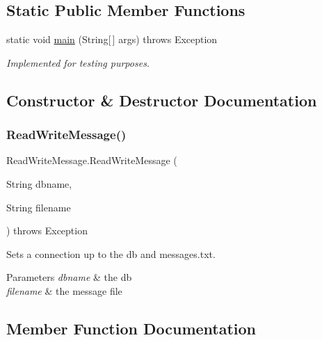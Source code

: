 \subsection*{Static Public Member Functions}
\begin{DoxyCompactItemize}
\item 
\mbox{\label{class_read_write_message_acbdb2486cf01f98e0288cedcf4747de9}} 
static void \hyperlink{class_read_write_message_acbdb2486cf01f98e0288cedcf4747de9}{main} (String\mbox{[}$\,$\mbox{]} args)  throws Exception     
\begin{DoxyCompactList}\small\item\em Implemented for testing purposes. \end{DoxyCompactList}\end{DoxyCompactItemize}


\subsection{Constructor \& Destructor Documentation}
\mbox{\label{class_read_write_message_a91757d43631c332753ef62b61e48413e}} 
\subsubsection{\texorpdfstring{Read\+Write\+Message()}{ReadWriteMessage()}}
{\footnotesize\ttfamily Read\+Write\+Message.\+Read\+Write\+Message (\begin{DoxyParamCaption}\item[{String}]{dbname,  }\item[{String}]{filename }\end{DoxyParamCaption}) throws Exception}



Sets a connection up to the db and messages.\+txt. 


\begin{DoxyParams}{Parameters}
{\em dbname} & the db \\
\hline
{\em filename} & the message file \\
\hline
\end{DoxyParams}


\subsection{Member Function Documentation}
\mbox{\label{class_read_write_message_a92a8e0f94a1b67491af6a7fbfdb52501}} 
